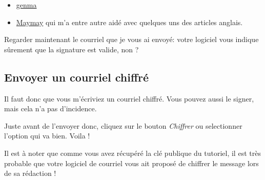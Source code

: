\begin{itemize}
\itemsep1pt\parskip0pt
\item
  \href{http://genma.free.fr/}{genma}
\item
  \href{https://maymay.net/}{Maymay} qui m'a entre autre aidé avec
  quelques uns des articles anglais.
\end{itemize}

Regarder maintenant le courriel que je vous ai envoyé: votre logiciel
vous indique sûrement que la signature est valide, non ?

\subsection{Envoyer un courriel
chiffré}\label{envoyer-un-courriel-chiffruxe9}

Il faut donc que vous m'écriviez un courriel chiffré. Vous pouvez aussi
le signer, mais cela n'a pas d'incidence.

Juste avant de l'envoyer donc, cliquez sur le bouton \emph{Chiffrer} ou
selectionner l'option qui va bien. Voila !

Il est à noter que comme vous avez récupéré la clé publique du tutoriel,
il est très probable que votre logiciel de courriel vous ait proposé de
chiffrer le message lors de sa rédaction !

